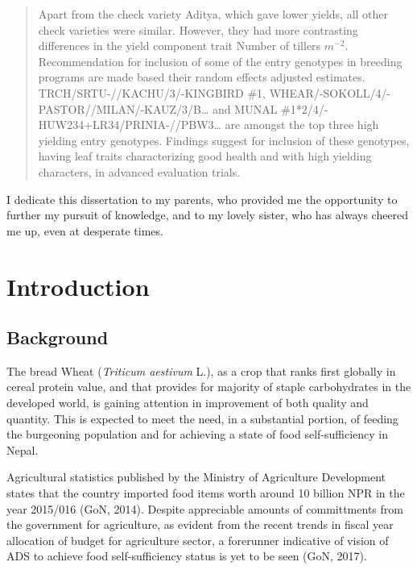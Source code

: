 \documentclass[12pt,oneside]{dukestatscithesis} %
\begin{document}
\begin{abstract}
    \par

    Apart from the check variety Aditya, which gave lower yields, all other check varieties were similar. However, they had more contrasting differences in the yield component trait Number of tillers \(m^{-2}\). Recommendation for inclusion of some of the entry genotypes in breeding programs are made based their random effects adjusted estimates. TRCH/SRTU-//KACHU/3/-KINGBIRD \#1, WHEAR/-SOKOLL/4/-PASTOR//MILAN/-KAUZ/3/B\ldots{} and MUNAL \#1*2/4/-HUW234+LR34/PRINIA-//PBW3\ldots{} are amongst the top three high yielding entry genotypes. Findings suggest for inclusion of these genotypes, having leaf traits characterizing good health and with high yielding characters, in advanced evaluation trials.
  \end{abstract}
  \begin{dedication}
    \setlength{\baselineskip}{1.5\baselineskip}

    I dedicate this dissertation to my parents, who provided me the opportunity to further my pursuit of knowledge, and to my lovely sister, who has always cheered me up, even at desperate times.
  \end{dedication}
\mainmatter %
\pagestyle{fancyplain} %

\hypertarget{introduction}{%
\chapter{Introduction}\label{introduction}}

\hypertarget{background}{%
\section{Background}\label{background}}

The bread Wheat (\emph{Triticum aestivum} L.), as a crop that ranks first globally in cereal protein value, and that provides for majority of staple carbohydrates in the developed world, is gaining attention in improvement of both quality and quantity. This is expected to meet the need, in a substantial portion, of feeding the burgeoning population and for achieving a state of food self-sufficiency in Nepal.

Agricultural statistics published by the Ministry of Agriculture Development states that the country imported food items worth around 10 billion NPR in the year 2015/016 (GoN, 2014). Despite appreciable amounts of committments from the government for agriculture, as evident from the recent trends in fiscal year allocation of budget for agriculture sector, a forerunner indicative of vision of ADS to achieve food self-sufficiency status is yet to be seen (GoN, 2017).
\end{document}
